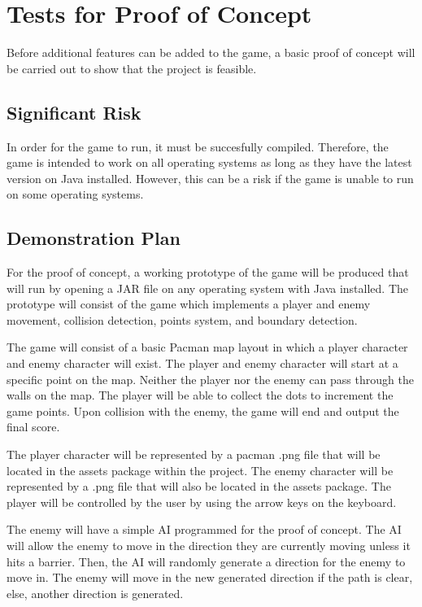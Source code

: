 \documentclass[12pt, titlepage]{article}
\begin{document}
\section{Tests for Proof of Concept}

Before additional features can be added to the game, a basic proof of concept will be carried out to show that the project is feasible. 

\subsection{Significant Risk}

In order for the game to run, it must be succesfully compiled. Therefore, the game is intended to work on all operating systems as long as they have the latest version on Java installed. However, this can be a risk if the game is unable to run on some operating systems.

\subsection{Demonstration Plan}

For the proof of concept, a working prototype of the game will be produced that will run by opening a JAR file on any operating system with Java installed. The prototype will consist of the game which implements a player and enemy movement, collision detection, points system, and boundary detection.

	The game will consist of a basic Pacman map layout in which a player character and enemy character will exist. The player and enemy character will start at a specific point on the map. Neither the player nor the enemy can pass through the walls on the map. The player will be able to collect the dots to increment the game points. Upon collision with the enemy, the game will end and output the final score.

	The player character will be represented by a pacman .png file that will be located in the assets package within the project. The enemy character will be represented by a .png file that will also be located in the assets package. The player will be controlled by the user by using the arrow keys on the keyboard.

	The enemy will have a simple AI programmed for the proof of concept. The AI will allow the enemy to move in the direction they are currently moving unless it hits a barrier. Then, the AI will randomly generate a direction for the enemy to move in. The enemy will move in the new generated direction if the path is clear, else, another direction is generated.
		
\end{document}
